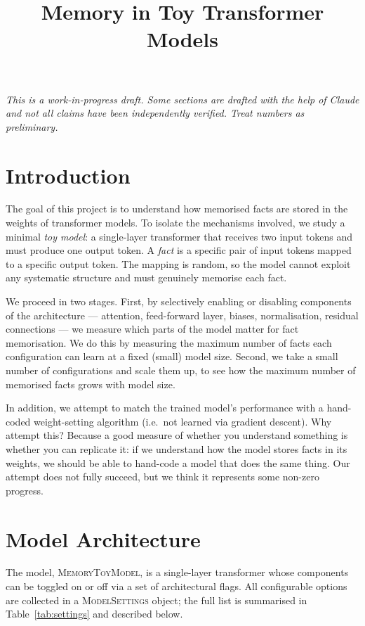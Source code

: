 \documentclass[11pt,a4paper]{article}
\title{Memory in Toy Transformer Models}
\author{}
\date{}
\begin{document}
\maketitle

\noindent\emph{This is a work-in-progress draft. Some sections are drafted with the help of Claude and not all claims have been independently verified. Treat numbers as preliminary.}

\section{Introduction}

The goal of this project is to understand how memorised facts are stored in the weights of transformer models. To isolate the mechanisms involved, we study a minimal \emph{toy model}: a single-layer transformer that receives two input tokens and must produce one output token. A \emph{fact} is a specific pair of input tokens mapped to a specific output token. The mapping is random, so the model cannot exploit any systematic structure and must genuinely memorise each fact.

We proceed in two stages. First, by selectively enabling or disabling components of the architecture --- attention, feed-forward layer, biases, normalisation, residual connections --- we measure which parts of the model matter for fact memorisation. We do this by measuring the maximum number of facts each configuration can learn at a fixed (small) model size. Second, we take a small number of configurations and scale them up, to see how the maximum number of memorised facts grows with model size.

In addition, we attempt to match the trained model's performance with a hand-coded weight-setting algorithm (i.e.\ not learned via gradient descent). Why attempt this? Because a good measure of whether you understand something is whether you can replicate it: if we understand how the model stores facts in its weights, we should be able to hand-code a model that does the same thing. Our attempt does not fully succeed, but we think it represents some non-zero progress.


\section{Model Architecture}
\label{sec:architecture}

The model, \textsc{MemoryToyModel}, is a single-layer transformer whose components can be toggled on or off via a set of architectural flags. All configurable options are collected in a \textsc{ModelSettings} object; the full list is summarised in Table~\ref{tab:settings} and described below.
\end{document}
